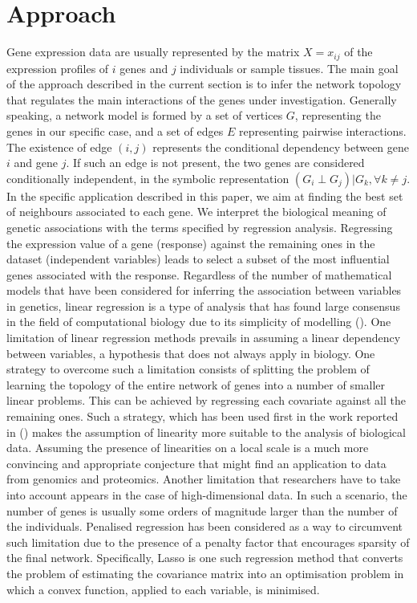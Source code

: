 \section{Approach}\label{approach}
Gene expression data are usually represented by the matrix $X = x_{ij}$ of the expression profiles of $i$ genes and $j$ individuals or sample tissues. 
The main goal of the approach described in the current section is to infer the network topology that regulates the main interactions of the genes under investigation. 
Generally speaking, a network model is formed by a set of vertices $G$, representing the genes in our specific case, and a set of edges $E$ representing pairwise interactions. The existence of edge $(i,j)$ represents the conditional dependency between gene $i$ and gene $j$.  If such an edge is not present, the two genes are considered conditionally independent, in the symbolic representation $(G_i \perp G_j) | G_k, \forall k \neq j$.
In the specific application described in this paper, we aim at finding the best set of neighbours associated to each gene. We interpret the biological meaning of genetic associations with the terms specified by regression analysis. Regressing the expression value of a gene (response) against the remaining ones in the dataset (independent variables) leads to select a subset of the most influential genes associated with the response.
Regardless of the number of mathematical models that have been considered for inferring the association between variables in genetics, linear regression is a type of analysis that has found large consensus in the field of computational biology due to its simplicity of modelling (\citealp{linregression2, linregression1}). %
One limitation of linear regression methods prevails in assuming a linear dependency between variables, a hypothesis that does not always apply in biology. One strategy to overcome such a limitation consists of splitting the problem of learning the topology of the entire network of genes into a number of smaller linear problems. This can be achieved by regressing each covariate against all the remaining ones.  Such a strategy, which has been used first in the work reported in (\citealp{Meinshausen06highdimensional}) makes the assumption of linearity more suitable to the analysis of biological data.  Assuming the presence of linearities on a local scale is a much more convincing and appropriate conjecture that might find an application to data from genomics and proteomics.
Another limitation that researchers have to take into account appears in the case of high-dimensional data. In such a scenario, the number of genes is usually some orders of magnitude larger than the number of the individuals. 
Penalised regression has been considered as a way to circumvent such limitation due to the presence of a penalty factor that encourages sparsity of the final network.
Specifically, Lasso is one such regression method that converts the problem of estimating the covariance matrix into an optimisation problem in which a convex function, applied to each variable, is minimised.

